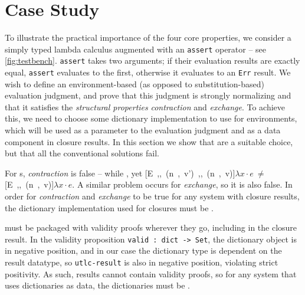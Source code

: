 \section{Case Study}
\label{sec:CaseStudy}

To illustrate the practical importance of the four core properties, we consider a simply typed lambda calculus
augmented with an \texttt{assert} operator -- see \autoref{fig:testbench}.
\texttt{assert} takes two arguments; if their evaluation results are exactly equal, \texttt{assert} evaluates to the first,
otherwise it evaluates to an \texttt{Err} result. We wish to define an environment-based (as opposed to substitution-based)
evaluation judgment, and prove that this judgment is strongly normalizing and that it  satisfies the
\emph{structural properties} \emph{contraction} and \emph{exchange}. To achieve this,
we need to choose some dictionary implementation to use for environments,
which will be used as a parameter to the evaluation judgment and as a data component in closure results.
In this section we show that \dds{} are a suitable choice, but that all the conventional solutions fail.



For \sal{}s, \emph{contraction} is false --
while , yet
\hbox{[E ,, (n , v') ,, (n , v)]$\lambda x \cdot e$}$~\ne~$\hbox{[E ,, (n , v)]$\lambda x \cdot e$}.
A similar problem occurs for \emph{exchange}, so it is also false.
In order for \emph{contraction} and \emph{exchange} to be true for any system with closure results,
the dictionary implementation used for closures must be \extensional.

\Cals{} must be packaged with validity proofs wherever they go, including in the closure result.
In the validity proposition \texttt{valid : dict -> Set}, the dictionary object is in negative position,
and in our case the dictionary type is dependent on the result datatype,
so \texttt{utlc-result} is also in negative position, violating strict positivity.
As such, results cannot contain validity proofs, so for any system that uses dictionaries as data,
the dictionaries must be \total.

